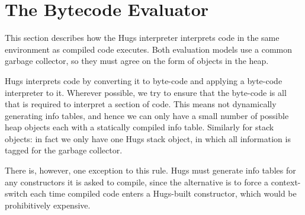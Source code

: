 \documentclass[11pt]{article}
\newcommand{\Section}[2]{\section{#1}\label{sec:#2}}
\begin{document}
\Section{The Bytecode Evaluator}{bytecode-evaluator}

This section describes how the Hugs interpreter interprets code in the
same environment as compiled code executes.  Both evaluation models
use a common garbage collector, so they must agree on the form of
objects in the heap.

Hugs interprets code by converting it to byte-code and applying a
byte-code interpreter to it.  Wherever possible, we try to ensure that
the byte-code is all that is required to interpret a section of code.
This means not dynamically generating info tables, and hence we can
only have a small number of possible heap objects each with a statically
compiled info table.  Similarly for stack objects: in fact we only
have one Hugs stack object, in which all information is tagged for the
garbage collector.

There is, however, one exception to this rule.  Hugs must generate
info tables for any constructors it is asked to compile, since the
alternative is to force a context-switch each time compiled code
enters a Hugs-built constructor, which would be prohibitively
expensive.
\end{document}
